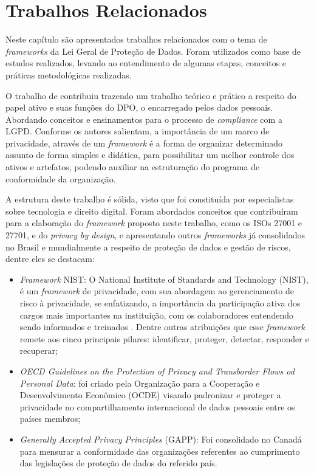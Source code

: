 \documentclass[
	12pt,				%
	openright,			%
	oneside,			%
	a4paper,			%
	english,			%
	french,				%
	spanish,			%
	brazil,				%
	]{abntex2}
\begin{document}
\chapter{Trabalhos Relacionados}
\label{ch: trabalhos relacionados}

Neste capítulo são apresentados trabalhos relacionados com o tema de \textit{frameworks} da Lei Geral de Proteção de Dados. Foram utilizados como base de estudos realizados, levando ao entendimento de algumas etapas, conceitos e práticas metodológicas realizadas.

O trabalho de \cite{Blum2020} contribuiu trazendo um trabalho teórico e prático a respeito do papel ativo e suas funções do DPO, o encarregado pelos dados pessoais. Abordando conceitos e ensinamentos para o processo de \textit{compliance} com a LGPD. Conforme os autores salientam, a importância de um marco de privacidade, através de um \textit{framework} é a forma de organizar determinado assunto de forma simples e didática, para possibilitar um melhor controle dos ativos e artefatos, podendo auxiliar na estruturação do programa de conformidade da organização.

A estrutura deste trabalho é sólida, visto que foi constituída por especialistas sobre tecnologia e direito digital. Foram abordados conceitos que contribuíram para a elaboração do \textit{framework} proposto neste trabalho, como os ISOs 27001 e 27701, e do \textit{privacy by design}, e apresentando outros \textit{frameworks} já consolidados no Brasil e mundialmente a respeito de proteção de dados e gestão de riscos, dentre eles se destacam:

\begin{itemize}
\item \textit{Framework} NIST: O National Institute of Standards and Technology  (NIST), é um \textit{framework} de privacidade, com sua abordagem ao gerenciamento de risco à privacidade, se enfatizando, a importância da participação ativa dos cargos mais importantes na instituição, com os colaboradores entendendo sendo informados e treinados \cite{Blum2020}. Dentre outras atribuições que esse \textit{framework} remete aos cinco principais pilares: identificar, proteger, detectar, responder e recuperar; 
\item \textit{OECD Guidelines on the Protection of Privacy and Transborder Flows od Personal Data}: foi criado pela Organização para a Cooperação e Desenvolvimento Econômico (OCDE) visando padronizar e proteger a privacidade no compartilhamento internacional de dados pessoais entre os países membros;
\item \textit{Generally Accepted Privacy Principles} (GAPP): Foi consolidado no Canadá para mensurar a conformidade das organizações referentes ao cumprimento das legislações de proteção de dados do referido país. 

\end{itemize}
\end{document}
